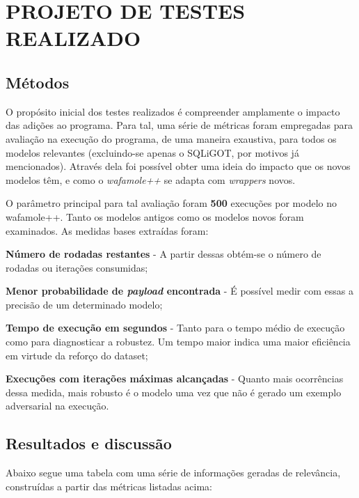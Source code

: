 \chapter{PROJETO DE TESTES REALIZADO}
\label{chp:capitulo5}

\section{Métodos}
O propósito inicial dos testes realizados é compreender amplamente o impacto das adições ao programa. Para tal, uma série de métricas foram empregadas para avaliação na execução do programa, de uma maneira exaustiva, para todos os modelos relevantes (excluindo-se apenas o SQLiGOT, por motivos já mencionados). Através dela foi possível obter uma ideia do impacto que os novos modelos têm, e como o \textit{wafamole++} se adapta com \textit{wrappers} novos.

O parâmetro principal para tal avaliação foram \textbf{500} execuções por modelo no wafamole++. Tanto os modelos antigos como os modelos novos foram examinados. As medidas bases extraídas foram:
\begin{alineas}
\item \textbf{Número de rodadas restantes} - A partir dessas obtém-se o número de rodadas ou iterações consumidas;
\item \textbf{Menor probabilidade de \textit{payload} encontrada} - É possível medir com essas a precisão de um determinado modelo;
\item \textbf{Tempo de execução em segundos} - Tanto para o tempo médio de execução como para diagnosticar a robustez. Um tempo maior indica uma maior eficiência em virtude da reforço do dataset;
\item \textbf{Execuções com iterações máximas alcançadas} - Quanto mais ocorrências dessa medida, mais robusto é o modelo uma vez que não é gerado um exemplo adversarial na execução.
\end{alineas}

\bigskip 

\section{Resultados e discussão}

Abaixo segue uma tabela com uma série de informações geradas de relevância, construídas a partir das métricas listadas acima: 

